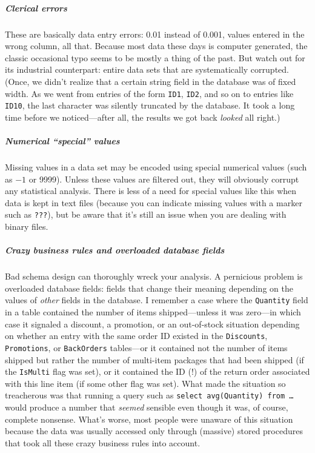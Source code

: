 \begin{unnumlist}
\subparagraph{Clerical errors}
\item These are basically data entry errors: 0.01  
  instead of 0.001, values entered in the wrong column, all that.
  Because most data these days is computer generated, the classic
  occasional typo seems to be mostly a thing of the past. But watch
  out for its industrial counterpart: entire data sets that are
  systematically corrupted. (Once, we didn't realize that a certain
  string field in the database was of fixed width.  As we went from
  entries of the form \texttt{ID1}, \texttt{ID2}, and so on to entries
  like \texttt{ID10}, the last character was silently truncated by the
  database. It took a long time before we noticed---after all, the
  results we got back \emph{looked} all right.)\pagebreak

\subparagraph{Numerical ``special'' values}
\item Missing values  in a data set may
  be encoded using special numerical values (such as $-1$ or 9999).
  Unless these values are filtered out, they will obviously corrupt
  any statistical analysis. There is less of a need for special values
  like this when data is kept in text files (because you can indicate
  missing values with a marker such as \texttt{???}), but be aware
  that it's still an issue when you are dealing with binary files.

\subparagraph{Crazy business rules and overloaded database fields}
\item Bad schema
  design can thoroughly wreck your analysis. A pernicious problem is
  overloaded database fields: fields that change their meaning
  depending on the values of \emph{other} fields in the database. I
  remember a case where the \texttt{Quantity} field in a table
  contained the number of items shipped---unless it was zero---in
  which case it signaled a discount, a promotion, or an out-of-stock
  situation depending on whether an entry with the same order ID
  existed in the \texttt{Discounts}, \texttt{Promotions}, or
  \texttt{BackOrders} tables---or it contained not the number of items
  shipped but rather the number of multi-item packages that had been
  shipped (if the \texttt{IsMulti} flag was set), or it contained the
  ID (!)  of the return order associated with this line item (if some
  other flag was set).  What made the situation so treacherous was
  that running a query such as \texttt{select avg(Quantity) from
    \dots} would produce a number that \emph{seemed} sensible even
  though it was, of course, complete nonsense. What's worse, most
  people were unaware of this situation because the data was usually
  accessed only through (massive) stored procedures that took all
  these crazy business rules into account.


\end{unnumlist}
